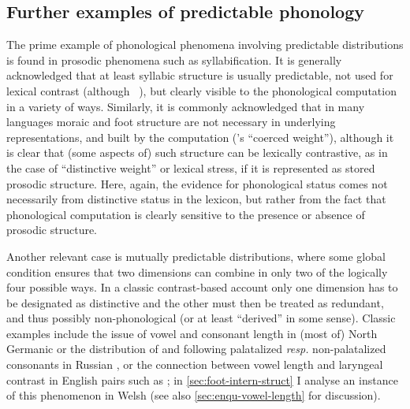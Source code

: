 \subsection{Further examples of predictable phonology}
\label{sec:furth-exampl-pred}

The prime example of phonological phenomena involving predictable distributions is found in prosodic phenomena such as syllabification. It is generally acknowledged that at least syllabic structure is usually predictable, \ie not used for lexical contrast (although \cf~\citealt{vaux-syll}), but clearly visible to the phonological computation in a variety of ways. Similarly, it is commonly acknowledged that in many languages moraic and foot structure are not necessary in underlying representations, and built by the computation (\cf \citeauthor{moren01:_distin}'s \citeyear{moren01:_distin} \enquote{coerced weight}), although it is clear that (some aspects of) such structure can be lexically contrastive, as in the case of  \enquote{distinctive weight} or lexical stress, if it is represented as stored prosodic structure. Here, again, the evidence for phonological status comes not necessarily from distinctive status in the lexicon, but rather from the fact that phonological computation is clearly sensitive to the presence or absence of prosodic structure.

Another relevant case is mutually predictable distributions, where some global condition ensures that two dimensions can combine in only two of the logically four possible ways. In a classic contrast\hyp based account only one dimension has to be designated as distinctive and the other must then be treated as redundant, and thus possibly non\hyp phonological (or at least \enquote{derived} in some sense). Classic examples include the issue of vowel and consonant length in (most of) North Germanic \citep[for a recent overview, \cf][]{kristoffersen11:_quant_old_norse_north_german} or the distribution of \ipa{[i]} and \ipa{[ɨ]} following palatalized \emph{resp.\@} non\hyp palatalized consonants in Russian \citep[\egm][]{plapp1996,padgett:_fasl18}, or the connection between vowel length and laryngeal contrast in English pairs such as ; in \cref{sec:foot-intern-struct} I analyse an instance of this phenomenon in Welsh (see also \cref{sec:enqu-vowel-length} for discussion).

